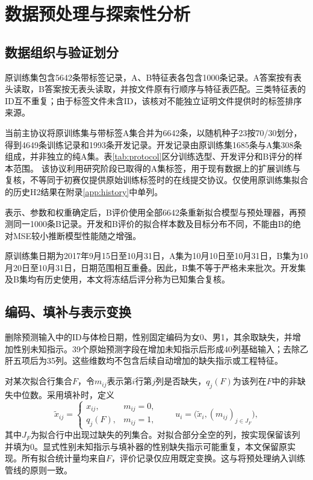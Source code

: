 \section{数据预处理与探索性分析}\label{sec:data}

\subsection{数据组织与验证划分}
原训练集包含5642条带标签记录，A、B特征表各包含1000条记录。A答案按有表头读取，B答案按无表头读取，并按文件原有行顺序与特征表匹配。三类特征表的ID互不重复；由于标签文件未含ID，该核对不能独立证明文件提供时的标签排序来源。

当前主协议将原训练集与带标签A集合并为6642条，以随机种子23按70/30划分，得到4649条训练记录和1993条开发记录。开发记录由原训练集1685条与A集308条组成，并非独立的纯A集。表\ref{tab:protocol}区分训练选型、开发评分和B评分的样本范围。
该协议利用研究阶段已取得的A集标签，用于现有数据上的扩展训练与复核，不等同于初赛仅提供原始训练标签时的在线提交协议。仅使用原训练集拟合的历史H2结果在附录\ref{app:history}中单列。


表示、参数和权重确定后，B评价使用全部6642条重新拟合模型与预处理器，再预测同一1000条B记录。开发和B评价的拟合样本数及目标分布不同，不能由B的绝对MSE较小推断模型性能随之增强。

原训练集日期为2017年9月15日至10月31日，A集为10月10日至10月31日，B集为10月20日至10月31日，日期范围相互重叠。因此，B集不等于严格未来批次。开发集及B集均有历史使用，本文将冻结后评分称为已知集合复核。

\subsection{编码、填补与表示变换}
删除预测输入中的ID与体检日期，性别固定编码为女0、男1，其余取缺失，并增加性别未知指示。39个原始预测字段在增加未知指示后形成40列基础输入；去除乙肝五项后为35列。这些维数均不包含后续自动增加的缺失指示或工程特征。

对某次拟合行集合$F$，令$m_{ij}$表示第$i$行第$j$列是否缺失，$q_j(F)$为该列在$F$中的非缺失中位数。采用填补时，定义
\begin{equation}
\widetilde x_{ij}=\begin{cases}
x_{ij},&m_{ij}=0,\\
q_j(F),&m_{ij}=1,
\end{cases}
\qquad u_i=\bigl(\widetilde x_i,(m_{ij})_{j\in J_F}\bigr),
\label{eq:impute}
\end{equation}
其中$J_F$为拟合行中出现过缺失的列集合。对拟合部分全空的列，按实现保留该列并填为0。显式性别未知指示与填补器的性别缺失指示可能重复，本文保留原实现。所有拟合统计量均来自$F$，评价记录仅应用既定变换。这与将预处理纳入训练管线的原则一致\cite{pitfalls}。

